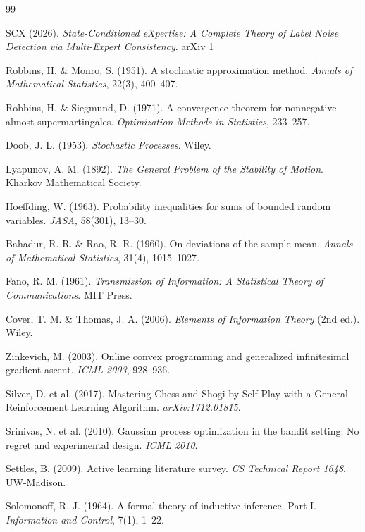 % 
\begin{thebibliography}{99}

SCX  (2026).
\emph{State-Conditioned eXpertise: A Complete Theory of Label Noise Detection via Multi-Expert Consistency}.
arXiv  1

Robbins, H. \& Monro, S. (1951).
A stochastic approximation method.
\emph{Annals of Mathematical Statistics}, 22(3), 400--407.

Robbins, H. \& Siegmund, D. (1971).
A convergence theorem for nonnegative almost supermartingales.
\emph{Optimization Methods in Statistics}, 233--257.

Doob, J. L. (1953).
\emph{Stochastic Processes}. Wiley.

Lyapunov, A. M. (1892).
\emph{The General Problem of the Stability of Motion}.
Kharkov Mathematical Society.

Hoeffding, W. (1963).
Probability inequalities for sums of bounded random variables.
\emph{JASA}, 58(301), 13--30.

Bahadur, R. R. \& Rao, R. R. (1960).
On deviations of the sample mean.
\emph{Annals of Mathematical Statistics}, 31(4), 1015--1027.

Fano, R. M. (1961).
\emph{Transmission of Information: A Statistical Theory of Communications}. MIT Press.

Cover, T. M. \& Thomas, J. A. (2006).
\emph{Elements of Information Theory} (2nd ed.). Wiley.

Zinkevich, M. (2003).
Online convex programming and generalized infinitesimal gradient ascent.
\emph{ICML 2003}, 928--936.

Silver, D. et al. (2017).
Mastering Chess and Shogi by Self-Play with a General Reinforcement Learning Algorithm.
\emph{arXiv:1712.01815}.

Srinivas, N. et al. (2010).
Gaussian process optimization in the bandit setting: No regret and experimental design.
\emph{ICML 2010}.

Settles, B. (2009).
Active learning literature survey.
\emph{CS Technical Report 1648}, UW-Madison.

Solomonoff, R. J. (1964).
A formal theory of inductive inference. Part I.
\emph{Information and Control}, 7(1), 1--22.


\end{thebibliography}
